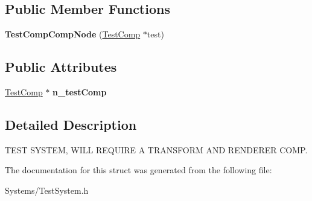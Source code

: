 \subsection*{Public Member Functions}
\begin{DoxyCompactItemize}
\item 
\mbox{\label{structTestCompCompNode_a705027eec8b5a044346dcac18239b303}} 
{\bfseries Test\+Comp\+Comp\+Node} (\hyperlink{classTestComp}{Test\+Comp} $\ast$test)
\end{DoxyCompactItemize}
\subsection*{Public Attributes}
\begin{DoxyCompactItemize}
\item 
\mbox{\label{structTestCompCompNode_a77d30d1a307c544efac2a1ccbd9d0e0c}} 
\hyperlink{classTestComp}{Test\+Comp} $\ast$ {\bfseries n\+\_\+test\+Comp}
\end{DoxyCompactItemize}


\subsection{Detailed Description}
T\+E\+ST S\+Y\+S\+T\+EM, W\+I\+LL R\+E\+Q\+U\+I\+RE A T\+R\+A\+N\+S\+F\+O\+RM A\+ND R\+E\+N\+D\+E\+R\+ER C\+O\+MP. 

The documentation for this struct was generated from the following file\+:\begin{DoxyCompactItemize}
\item 
Systems/Test\+System.\+h\end{DoxyCompactItemize}
